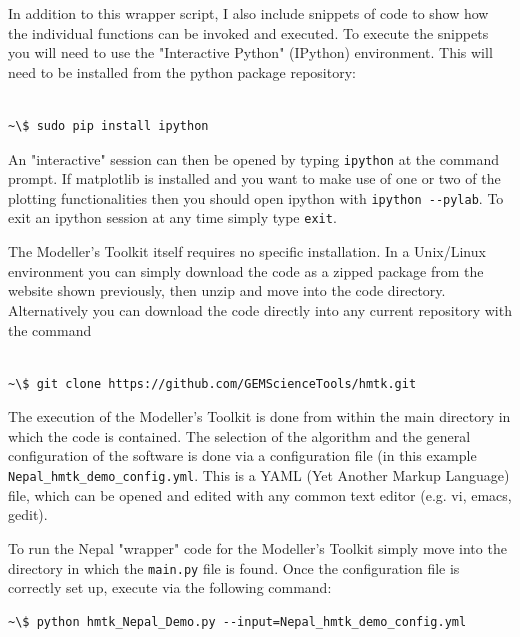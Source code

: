 In addition to this wrapper script, I also include snippets of code to show how the individual functions can be invoked and executed. To execute the snippets you will need to use the "Interactive Python" (IPython) environment. This will need to be installed from the python package repository:

\begin{Verbatim}[frame=single, commandchars=\\\{\}, fontsize=\scriptsize]

~\$ sudo pip install ipython

\end{Verbatim}

An "interactive" session can then be opened by typing \verb=ipython= at the command prompt. If matplotlib is installed and you want to make use of one or two of the plotting functionalities then you should open ipython with \verb=ipython --pylab=. To exit an ipython session at any time simply type \verb=exit=.

The Modeller's Toolkit itself requires no specific installation. In a Unix/Linux environment you can simply download the code as a zipped package from the website shown previously, then unzip and move into the code directory.
Alternatively you can download the code directly into  any current repository with the command

\begin{Verbatim}[frame=single, commandchars=\\\{\}, fontsize=\scriptsize]

~\$ git clone https://github.com/GEMScienceTools/hmtk.git

\end{Verbatim}


The execution of the Modeller's Toolkit is done from within the main directory in which the code is contained. The selection of the algorithm and the general configuration of the software is done via a configuration file (in this example \verb=Nepal_hmtk_demo_config.yml=. This is a YAML (Yet Another Markup Language) file, which can be opened and edited with any common text editor (e.g. vi, emacs, gedit).

To run the Nepal "wrapper" code for the Modeller's Toolkit simply move into the directory in which the \verb=main.py= file is found. Once the configuration file is correctly set up, execute via the following command:
\begin{Verbatim}[frame=single, commandchars=\\\{\}, fontsize=\scriptsize]
~\$ python hmtk_Nepal_Demo.py --input=Nepal_hmtk_demo_config.yml
\end{Verbatim}

